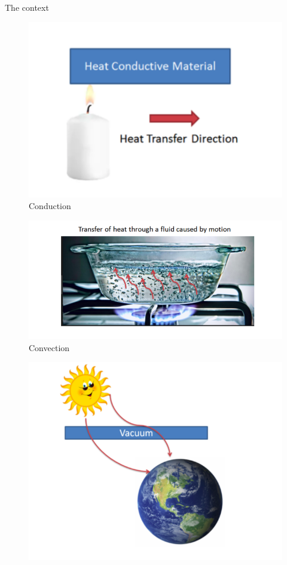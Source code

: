 \begin{frame}[allowframebreaks]{The context}
\begin{minipage}{0.30\linewidth}
\begin{figure}
        \includegraphics[width=1.2\linewidth]{images/enkf/conduction.png}
        \caption{Conduction}
    \end{figure}
\end{minipage} \;
\begin{minipage}{0.30\linewidth}
    \begin{figure}
        \centering
        \includegraphics[width=1.2\linewidth]{images/enkf/convection.png}
        \caption{Convection}
    \end{figure}
\end{minipage}
\begin{minipage}{0.35\linewidth}
    \begin{figure}
        \centering
        \includegraphics[width=1.2\linewidth]{images/enkf/radiation.png}

\end{figure}
\end{minipage}
\end{frame}
